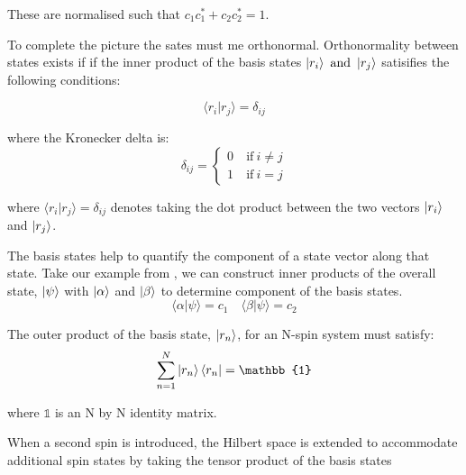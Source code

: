 These are normalised such that $c_1c_1^* + c_2c_2^* = 1$.

To complete the picture the sates must me orthonormal. Orthonormality between states exists if
if the inner product of the basis states $\ket{r_i} ~\text{and}~ \ket{r_j}$ satisifies the following conditions:

\begin{equation}
  \langle r_i\vert r_j\rangle = \delta_{ij}
\end{equation}

where the Kronecker delta is:
\begin{equation}
  \delta_{ij} = \begin{cases}
    0 & ~\text{if}~ i \ne j\\
    1 & ~\text{if}~ i = j
                \end{cases}
\end{equation}

where $\langle r_i\vert r_j\rangle = \delta_{ij}$ denotes taking the dot product between the two
vectors $\ket{r_i}$ and $\ket{r_j}$.

The basis states help to quantify the component of a state vector along that state. Take our example from , we can construct inner products of the overall state, $\ket{\psi}$ with $\ket{\alpha}$ and $\ket{\beta}$ to determine component of the basis states.
\begin{equation}
  \langle\alpha\vert\psi\rangle = c_1 \quad \langle\beta\vert\psi\rangle = c_2
\end{equation}

The outer product of the basis state, $\ket{r_n}$, for an N-spin system must satisfy:
\begin{equation}
  \sum_{n=1}^{N} \ket{r_n}\bra{r_n} = \mathbb{1}
\end{equation}

where $\mathbb{1}$ is an N by N identity matrix.

When a second spin is introduced, the Hilbert space is extended to accommodate additional spin
states by taking the tensor product of the basis states


